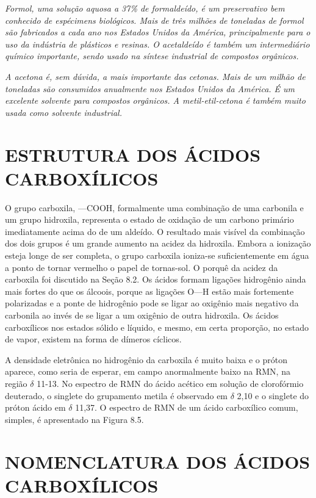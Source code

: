 \emph{Formol, uma solução aquosa a 37\% de formaldeído, é um preservativo bem conhecido de espécimens biológicos. Mais de três milhões de toneladas de formol são fabricados a cada ano nos Estados Unidos da América, principalmente para o uso da indústria de plásticos e resinas. O acetaldeído é também um intermediário químico importante, sendo usado na síntese industrial de compostos orgânicos.}

\emph{A acetona é, sem dúvida, a mais importante das cetonas. Mais de um milhão de toneladas são consumidos anualmente nos Estados Unidos da América. É um excelente solvente para compostos orgânicos. A metil-etil-cetona é também muito usada como solvente industrial.}
\par\bigskip

\section{ESTRUTURA DOS ÁCIDOS CARBOXÍLICOS}

O grupo carboxila, —COOH, formalmente uma combinação de uma carbonila e um grupo hidroxila, representa o estado de oxidação de um carbono primário imediatamente acima do de um aldeído. O resultado mais visível da combinação dos dois grupos é um grande aumento na acidez da hidroxila. Embora a ionização esteja longe de ser completa, o grupo carboxila ioniza-se suficientemente em água a ponto de tornar vermelho o papel de tornas-sol. O porquê da acidez da carboxila foi discutido na Seção 8.2. Os ácidos formam ligações hidrogênio ainda mais fortes do que os álcoois, porque as ligações O—H estão mais fortemente polarizadas e a ponte de hidrogênio pode se ligar ao oxigênio mais negativo da carbonila ao invés de se ligar a um oxigênio de outra hidroxila. Os ácidos carboxílicos nos estados sólido e líquido, e mesmo, em certa proporção, no estado de vapor, existem na forma de dímeros cíclicos.

A densidade eletrônica no hidrogênio da carboxila é muito baixa e o próton aparece, como seria de esperar, em campo anormalmente baixo na RMN, na região $\delta$ 11-13. No espectro de RMN do ácido acético em solução de clorofórmio deuterado, o singlete do grupamento metila é observado em $\delta$ 2,10 e o singlete do próton ácido em $\delta$ 11,37. O espectro de RMN de um ácido carboxílico comum, simples, é apresentado na Figura 8.5.

\section{NOMENCLATURA DOS ÁCIDOS CARBOXÍLICOS}


